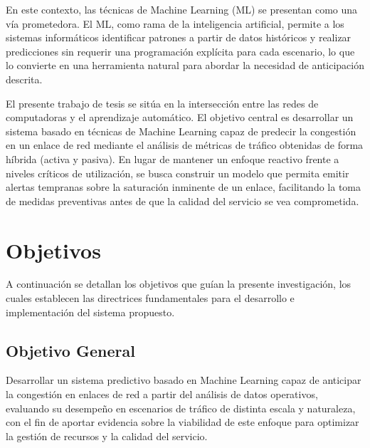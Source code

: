 \documentclass[12pt]{report}
\begin{document}
En este contexto, las técnicas de Machine Learning (ML) se presentan como una vía prometedora. El ML, como rama de la inteligencia artificial, permite a los sistemas informáticos identificar patrones a partir de datos históricos y realizar predicciones sin requerir una programación explícita para 
cada escenario, lo que lo convierte en una herramienta natural para abordar la necesidad de anticipación descrita.

El presente trabajo de tesis se sitúa en la intersección entre las redes de computadoras y el aprendizaje automático. El objetivo central es desarrollar un sistema basado en técnicas de Machine Learning capaz de predecir la congestión en un enlace de red mediante el análisis de métricas de tráfico 
obtenidas de forma híbrida (activa y pasiva). En lugar de mantener un enfoque reactivo frente a niveles críticos de utilización, se busca construir un modelo que permita emitir alertas tempranas sobre la saturación inminente de un enlace, facilitando la toma de medidas preventivas antes de que la 
calidad del servicio se vea comprometida.

\newpage
\section{Objetivos}

A continuación se detallan los objetivos que guían la presente investigación, los cuales establecen las directrices fundamentales para el desarrollo e implementación del sistema propuesto.

\subsection{Objetivo General}

Desarrollar un sistema predictivo basado en Machine Learning capaz de anticipar la congestión en enlaces de red a partir del análisis de datos operativos, evaluando su desempeño en escenarios de tráfico de distinta escala y naturaleza, con el fin de aportar evidencia sobre la viabilidad de este 
enfoque para optimizar la gestión de recursos y la calidad del servicio.
\end{document}
